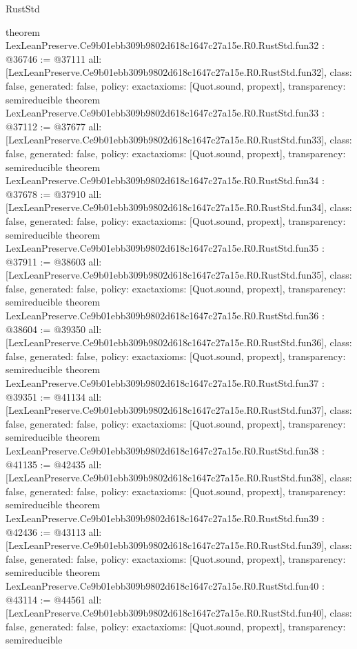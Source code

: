 \begin{lexlean}{RustStd}
\begin{coremodule}
{}
theorem LexLeanPreserve.Ce9b01ebb309b9802d618c1647c27a15e.R0.RustStd.fun32 : @36746 := @37111 {
  all: [LexLeanPreserve.Ce9b01ebb309b9802d618c1647c27a15e.R0.RustStd.fun32],
  class: false,
  generated: false,
  policy: exact{axioms: [Quot.sound, propext]},
  transparency: semireducible
}
theorem LexLeanPreserve.Ce9b01ebb309b9802d618c1647c27a15e.R0.RustStd.fun33 : @37112 := @37677 {
  all: [LexLeanPreserve.Ce9b01ebb309b9802d618c1647c27a15e.R0.RustStd.fun33],
  class: false,
  generated: false,
  policy: exact{axioms: [Quot.sound, propext]},
  transparency: semireducible
}
theorem LexLeanPreserve.Ce9b01ebb309b9802d618c1647c27a15e.R0.RustStd.fun34 : @37678 := @37910 {
  all: [LexLeanPreserve.Ce9b01ebb309b9802d618c1647c27a15e.R0.RustStd.fun34],
  class: false,
  generated: false,
  policy: exact{axioms: [Quot.sound, propext]},
  transparency: semireducible
}
theorem LexLeanPreserve.Ce9b01ebb309b9802d618c1647c27a15e.R0.RustStd.fun35 : @37911 := @38603 {
  all: [LexLeanPreserve.Ce9b01ebb309b9802d618c1647c27a15e.R0.RustStd.fun35],
  class: false,
  generated: false,
  policy: exact{axioms: [Quot.sound, propext]},
  transparency: semireducible
}
theorem LexLeanPreserve.Ce9b01ebb309b9802d618c1647c27a15e.R0.RustStd.fun36 : @38604 := @39350 {
  all: [LexLeanPreserve.Ce9b01ebb309b9802d618c1647c27a15e.R0.RustStd.fun36],
  class: false,
  generated: false,
  policy: exact{axioms: [Quot.sound, propext]},
  transparency: semireducible
}
theorem LexLeanPreserve.Ce9b01ebb309b9802d618c1647c27a15e.R0.RustStd.fun37 : @39351 := @41134 {
  all: [LexLeanPreserve.Ce9b01ebb309b9802d618c1647c27a15e.R0.RustStd.fun37],
  class: false,
  generated: false,
  policy: exact{axioms: [Quot.sound, propext]},
  transparency: semireducible
}
theorem LexLeanPreserve.Ce9b01ebb309b9802d618c1647c27a15e.R0.RustStd.fun38 : @41135 := @42435 {
  all: [LexLeanPreserve.Ce9b01ebb309b9802d618c1647c27a15e.R0.RustStd.fun38],
  class: false,
  generated: false,
  policy: exact{axioms: [Quot.sound, propext]},
  transparency: semireducible
}
theorem LexLeanPreserve.Ce9b01ebb309b9802d618c1647c27a15e.R0.RustStd.fun39 : @42436 := @43113 {
  all: [LexLeanPreserve.Ce9b01ebb309b9802d618c1647c27a15e.R0.RustStd.fun39],
  class: false,
  generated: false,
  policy: exact{axioms: [Quot.sound, propext]},
  transparency: semireducible
}
theorem LexLeanPreserve.Ce9b01ebb309b9802d618c1647c27a15e.R0.RustStd.fun40 : @43114 := @44561 {
  all: [LexLeanPreserve.Ce9b01ebb309b9802d618c1647c27a15e.R0.RustStd.fun40],
  class: false,
  generated: false,
  policy: exact{axioms: [Quot.sound, propext]},
  transparency: semireducible
}
\end{coremodule}
\end{lexlean}
